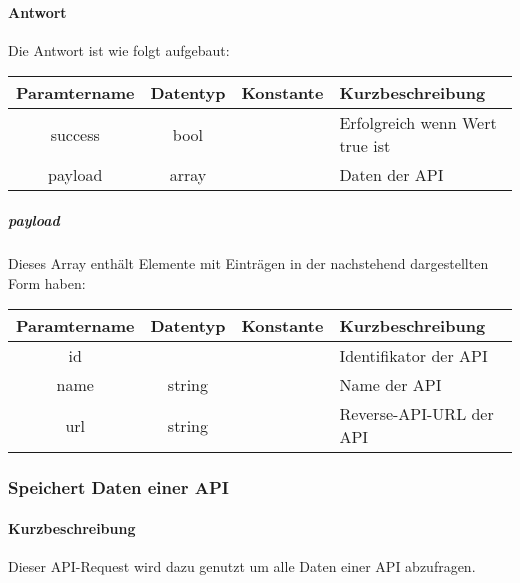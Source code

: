 \paragraph{Antwort}Die Antwort ist wie folgt aufgebaut:
\begin{table}[H]
	\begin{tabular}{|c|c|c|p{6.5cm}|}
		\hline
		\textbf{Paramtername} & \textbf{Datentyp} & \textbf{Konstante} & \textbf{Kurzbeschreibung}            \\ \hline                
		success             & bool             &                 & Erfolgreich wenn Wert {\glqq true\grqq} ist \\ \hline
		payload             & array            &                 & Daten der API \\ \hline
	\end{tabular}
\end{table}
\subparagraph{payload}Dieses Array enthält Elemente mit Einträgen in der nachstehend dargestellten Form haben:
\begin{table}[H]
	\begin{tabular}{|c|c|c|p{6.5cm}|}
		\hline
		\textbf{Paramtername} & \textbf{Datentyp} & \textbf{Konstante} & \textbf{Kurzbeschreibung}    \\ \hline
		id                      &                   &                 & Identifikator der API \\ \hline
		name                    & string            &                 & Name der API \\ \hline
		url                     & string            &                 & Reverse-API-URL der API \\ \hline
	\end{tabular}
\end{table}
\subsubsection{Speichert Daten einer API}
\paragraph{Kurzbeschreibung}Dieser API-Request wird dazu genutzt um alle Daten einer API abzufragen.
